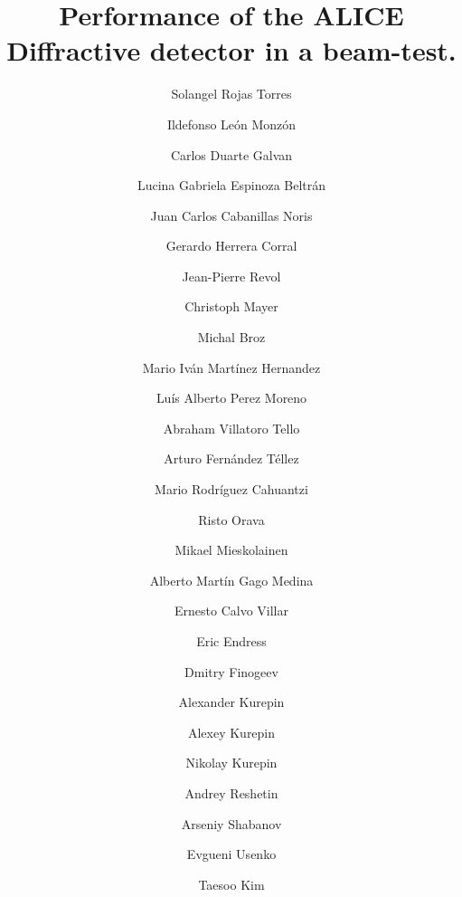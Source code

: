 \documentclass[review]{elsarticle}
\begin{document}
\linenumbers

\begin{frontmatter}

\title{Performance of the ALICE Diffractive detector in a beam-test.}



\author[uas]{Solangel Rojas Torres}
\author[uas]{Ildefonso Le\'on Monz\'on}
\author[uas]{Carlos Duarte Galvan}
\author[uas]{Lucina Gabriela Espinoza Beltr\'an}
\author[uas]{Juan Carlos Cabanillas Noris}
\author[civestav]{Gerardo Herrera Corral}
\author[csr]{Jean-Pierre Revol}
\author[thn]{Christoph Mayer}
\author[ctu]{Michal Broz}
\author[buap]{Mario Iv\'an Mart\'inez Hernandez}
\author[buap]{Lu\'is Alberto Perez Moreno}
\author[buap]{Abraham Villatoro Tello}
\author[buap]{Arturo Fern\'andez T\'ellez}
\author[buap]{Mario Rodr\'iguez Cahuantzi}
\author[Helsinki0,Helsinki1]{Risto Orava}
\author[Helsinki0]{Mikael Mieskolainen}
\author[pucp]{Alberto Mart\'in Gago Medina}
\author[pucp]{Ernesto Calvo Villar}
\author[pucp]{Eric Endress}
\author[Helsinki0]{Dmitry Finogeev}
\author[inr]{Alexander Kurepin}
\author[inr]{Alexey Kurepin}
\author[inr]{Nikolay Kurepin}
\author[inr]{Andrey Reshetin}
\author[inr]{Arseniy Shabanov}
\author[inr]{Evgueni Usenko}
\author[seul]{Taesoo Kim}

\address[uas]{\textit{Universidad Aut\'onoma de Sinaloa},CULIACAN, M\'exico}
\address[buap]{\textit{Benem\'erita Univ. Aut\'onoma de Puebla},PUEBLA, M\'exico}
\address[civestav]{\textit{Centro de Investigación y de Estudios Avanzados del IPN}, C.D. M\'EXICO, M\'exico}
\address[csr]{Centro Studi e Ricerche ``Enrico Fermi'', ROMA, Italy}
\address[thn]{\textit{The Henryk Niewodniczanski Inst. of Nucl. Physics Polish Academy of Sciences}, CRACOW, Poland}
\address[seul]{\textit{Yonsei University}, SEOUL, South Korea}
\address[ctu]{\textit{Czech Technical University of Prague}, PRAHA, Czech Republic}
\address[Helsinki0]{\textit{Helsinki Inst. of Physics}, HELSINKI, Finland} 
\address[Helsinki1]{\textit{The University of Helsinki}, HELSINKI, Finland} 
\address[pucp]{\textit{Pontificia Universidad Cat\'olica del Per\'u}, LIMA, Per\'u}
\address[inr]{\textit{Russian Academy of Sciences, Inst. for Nuclear Research}, MOSCOW, Russia}


\end{frontmatter}
\end{document}
